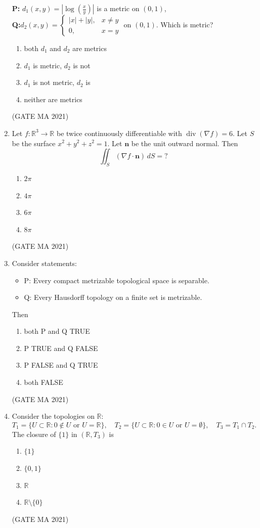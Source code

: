 \documentclass[journal,12pt,onecolumn]{IEEEtran}
\theoremstyle{remark}
\begin{document}
\begin{enumerate}
  \textbf{P:}  $
    d_1(x,y) = |\log(\frac{x}{y})|$ is a metric on $(0,1)$, \\
    \textbf{Q:}$d_2(x,y) = \begin{cases} |x|+|y|, & x \neq y \\ 0, & x=y\end{cases}
    $
    on $(0,1)$. Which is metric?
    \begin{enumerate}
        \item both $d_1$ and $d_2$ are metrics
        \item $d_1$ is metric, $d_2$ is not
        \item $d_1$ is not metric, $d_2$ is
        \item neither are metrics
    \end{enumerate}
\hfill(GATE MA 2021)
    \item Let $f:\mathbb{R}^3 \to \mathbb{R}$ be twice continuously differentiable with $\operatorname{div}(\nabla f) = 6$. Let $S$ be the surface $x^2 + y^2 + z^2 = 1$. Let $\mathbf{n}$ be the unit outward normal. Then
    $$
    \iint_S (\nabla f \cdot \mathbf{n})\, dS = ?
    $$
    \begin{enumerate}
        \item $2\pi$
        \item $4\pi$
        \item $6\pi$
        \item $8\pi$
    \end{enumerate}
\hfill(GATE MA 2021)
    \item Consider statements:
    \begin{itemize}
        \item P: Every compact metrizable topological space is separable.
        \item Q: Every Hausdorff topology on a finite set is metrizable.
    \end{itemize}
    Then
    \begin{enumerate}
        \item both P and Q TRUE
        \item P TRUE and Q FALSE
        \item P FALSE and Q TRUE
        \item both FALSE
    \end{enumerate}
    \hfill(GATE MA 2021)
    \item Consider the topologies on $\mathbb{R}$:
    $$
    T_1 = \{U \subset \mathbb{R} : 0 \notin U \text{ or } U = \mathbb{R}\},
    \quad T_2 = \{U \subset \mathbb{R} : 0 \in U \text{ or } U = \emptyset\},
    \quad T_3 = T_1 \cap T_2.
    $$
    The closure of $\{1\}$ in $(\mathbb{R}, T_3)$ is
    \begin{enumerate}
        \item $\{1\}$
        \item $\{0,1\}$
        \item $\mathbb{R}$
        \item $\mathbb{R} \setminus \{0\}$
    \end{enumerate}
    \hfill(GATE MA 2021)


\end{enumerate}
\end{document}
